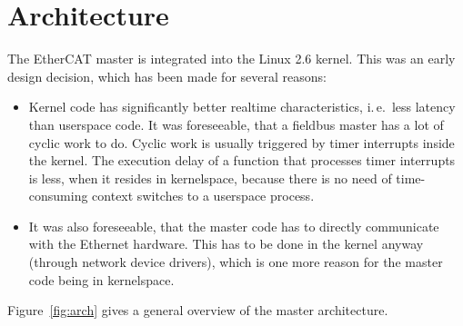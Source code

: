 \documentclass[a4paper,12pt,BCOR6mm,bibtotoc,idxtotoc]{scrbook}
\begin{document}

\chapter{Architecture}
\label{sec:arch}

The EtherCAT master is integrated into the Linux 2.6 kernel. This was
an early design decision, which has been made for several reasons:

\begin{itemize}

\item Kernel code has significantly better realtime characteristics,
i.\,e.~less latency than userspace code. It was foreseeable, that a fieldbus
master has a lot of cyclic work to do. Cyclic work is usually triggered by
timer interrupts inside the kernel. The execution delay of a function that
processes timer interrupts is less, when it resides in kernelspace, because
there is no need of time-consuming context switches to a userspace process.

\item It was also foreseeable, that the master code has to directly
communicate with the Ethernet hardware. This has to be done in the kernel
anyway (through network device drivers), which is one more reason for the
master code being in kernelspace.

\end{itemize}

Figure~\ref{fig:arch} gives a general overview of the master architecture.
\end{document}
